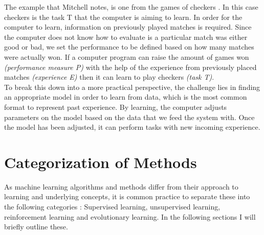 The example that Mitchell notes, is one from the games of checkers \cite{mitchell2006discipline}. In this case checkers is the task T that the computer is aiming to learn. In order for the computer to learn, information on previously played matches is required. Since the computer does not know how to evaluate is a particular match was either good or bad, we set the performance to be defined based on how many matches were actually won. If a computer program can raise the amount of games won \textit{(performance measure P)} with the help of the experience from previously placed matches \textit{(experience E)} then it can learn to play checkers \textit{(task T)}. \\

To break this down into a more practical perspective, the challenge lies in finding an appropriate model in order to learn from data, which is the most common format to represent past experience. By learning, the computer adjusts parameters on the model based on the data that we feed the system with. Once the model has been adjusted, it can perform tasks with new incoming experience.

\section{Categorization of Methods}
As machine learning algorithms and methods differ from their approach to learning and underlying concepts, it is common practice to separate these into the following categories \cite{Duda:2000:PC:954544, Marsland:2009:MLA:1571643}  : Supervised learning, unsupervised learning, reinforcement learning and evolutionary learning. In the following sections I will briefly outline these.\\

